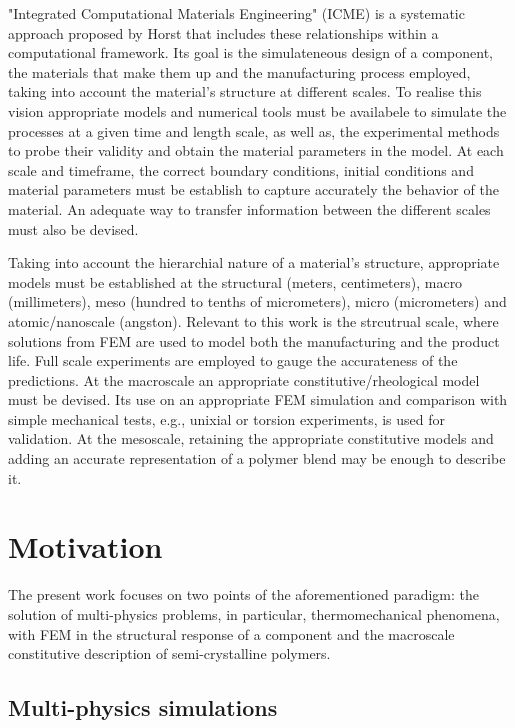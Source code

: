 "Integrated Computational Materials Engineering" (ICME) is a systematic approach proposed by Horst \cite{} that includes these relationships within a computational framework.
Its goal is the simulateneous design of a component, the materials that make them up and the manufacturing process employed, taking into account the material's structure at different scales.
To realise this vision appropriate models and numerical tools must be availabele to simulate the processes at a given time and length scale, as well as, the experimental methods to probe their validity and obtain the material parameters in the model.
At each scale and timeframe, the correct boundary conditions, initial conditions and material parameters must be establish to capture accurately the behavior of the material.
An adequate way to transfer information between the different scales must also be devised.

Taking into account the hierarchial nature of a material's structure, appropriate models must be established at the structural (meters, centimeters), macro (millimeters), meso (hundred to tenths of micrometers), micro (micrometers) and atomic/nanoscale (angston).
Relevant to this work is the strcutrual scale, where solutions from FEM are used to model both the manufacturing and the product life.
Full scale experiments are employed to gauge the accurateness of the predictions.
At the macroscale an appropriate constitutive/rheological model must be devised.
Its use on an appropriate FEM simulation and comparison with simple mechanical tests, e.g., unixial or torsion experiments, is used for validation.
At the mesoscale, retaining the appropriate constitutive models and adding an accurate representation of a polymer blend may be enough to describe it.

\section{Motivation}

The present work focuses on two points of the aforementioned paradigm: the solution of multi-physics problems, in particular, thermomechanical phenomena, with FEM in the structural response of a component and the macroscale constitutive description of semi-crystalline polymers.

\subsection{Multi-physics simulations}

